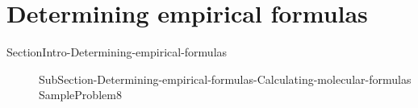 \documentclass[main.tex]{subfiles}
\newcommand\chapterlabel{Ch-Table}\setcounter{figurenewcounter}{0}\setcounter{tablenewcounter}{0}\setcounter{formulanewcounter}{0}\chapterpicture{../{\chapterlabel}/figure1}\chapterpicturelabel{PxFuel}
\begin{document}
\section{Determining empirical formulas} {SectionIntro-Determining-empirical-formulas} 
\sloppy\begin{description} 
\item[]{SubSection-Determining-empirical-formulas-Calculating-molecular-formulas} 
{SampleProblem8} 
\end{description} 



%
%
\end{document}

